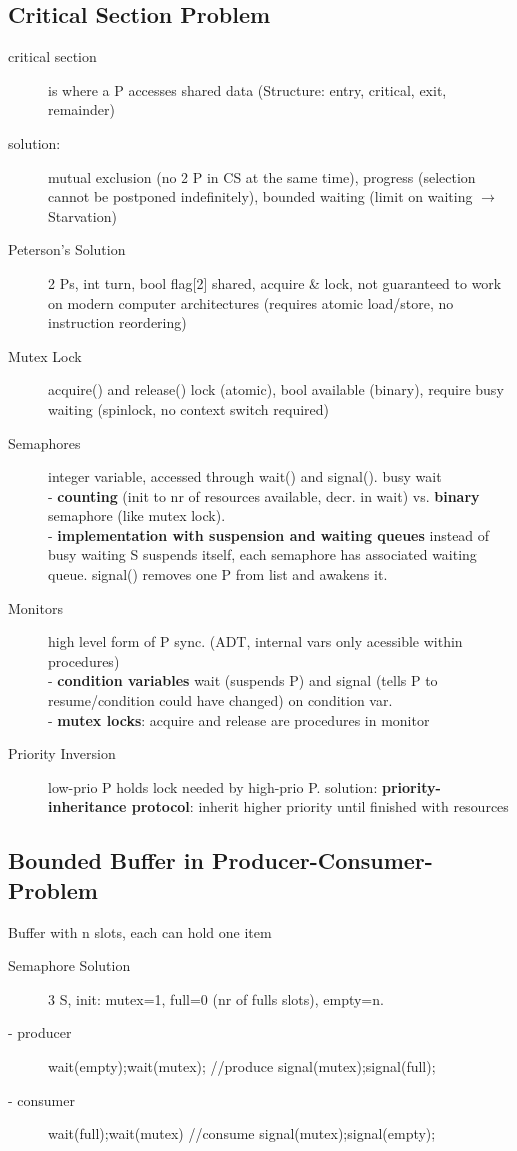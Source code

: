 \subsection*{Critical Section Problem}
\begin{description}
    \item[critical section]is where a P accesses shared data (Structure: entry, critical, exit, remainder)
    \item[solution:]mutual exclusion (no 2 P in CS at the same time), progress (selection cannot be postponed indefinitely), bounded waiting (limit on waiting $\rightarrow$ Starvation)
    \item[Peterson's Solution]2 Ps, int turn, bool flag[2] shared, acquire \& lock, not guaranteed to work on modern computer architectures (requires atomic load/store, no instruction reordering)
    \item[Mutex Lock] acquire() and release() lock (atomic), bool available (binary), require busy waiting (spinlock, no context switch required)
    \item[Semaphores] integer variable, accessed through wait() and signal(). busy wait \\
        - \textbf{counting} (init to nr of resources available, decr. in wait) vs. \textbf{binary} semaphore (like mutex lock). \\
        -  \textbf{implementation with suspension and waiting queues} instead of busy waiting S suspends itself, each semaphore has associated waiting queue. signal() removes one P from list and awakens it.   %
    \item[Monitors] high level form of P sync. (ADT, internal vars only acessible within procedures) \\
        - \textbf{condition variables} wait (suspends P) and signal (tells P to resume/condition could have changed) on condition var. \\
        - \textbf{mutex locks}: acquire and release are procedures in monitor
    \item[Priority Inversion] low-prio P holds lock needed by high-prio P. solution: \textbf{priority-inheritance protocol}: inherit higher priority until finished with resources
\end{description}
\subsection*{Bounded Buffer in Producer-Consumer-Problem}
Buffer with n slots, each can hold one item
\begin{description}
    \item[Semaphore Solution]3 S, init: mutex=1, full=0 (nr of fulls slots), empty=n.
    \item[- producer]wait(empty);wait(mutex); //produce signal(mutex);signal(full);
    \item[- consumer]wait(full);wait(mutex) //consume signal(mutex);signal(empty);
\end{description}
